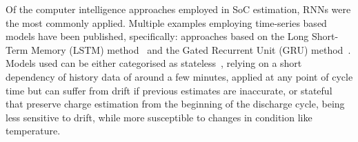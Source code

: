 %
%
Of the computer intelligence approaches employed in SoC estimation, RNNs were the most commonly applied.
Multiple examples employing time-series based models have been published, specifically: approaches based on the Long Short-Term Memory (LSTM) method~\cite{Chemali2017,mamo_long_2020,zhang_deep_2020} and the Gated Recurrent Unit (GRU) method~\cite{song_lithium-ion_2018,jiao_gru-rnn_2020,xiao_accurate_2019,javid_adaptive_2020}.
Models used can be either categorised as stateless~\cite{Chemali2017,javid_adaptive_2020,zhang_deep_2020}, relying on a short dependency of history data of around a few minutes, applied at any point of cycle time but can suffer from drift if previous estimates are inaccurate, or stateful~\cite{song_lithium-ion_2018,jiao_gru-rnn_2020,xiao_accurate_2019} that preserve charge estimation from the beginning of the discharge cycle, being less sensitive to drift, while more susceptible to changes in condition like temperature.
